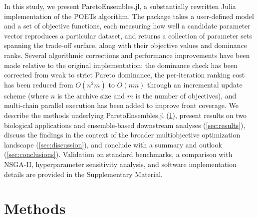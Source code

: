 \documentclass[preprint,review,12pt]{elsarticle}
\begin{document}
In this study, we present ParetoEnsembles.jl, a substantially rewritten Julia~\cite{Bezanson2017} implementation of the POETs algorithm.
The package takes a user-defined model and a set of objective functions, each measuring how well a candidate parameter vector reproduces a particular dataset, and returns a collection of parameter sets spanning the trade-off surface, along with their objective values and dominance ranks.
Several algorithmic corrections and performance improvements have been made relative to the original implementation: the dominance check has been corrected from weak to strict Pareto dominance, the per-iteration ranking cost has been reduced from $O(n^{2}m)$ to $O(nm)$ through an incremental update scheme (where $n$ is the archive size and $m$ is the number of objectives), and multi-chain parallel execution has been added to improve front coverage.
We describe the methods underlying ParetoEnsembles.jl (\cref{sec:methods}), present results on two biological applications and ensemble-based downstream analyses (\cref{sec:results}), discuss the findings in the context of the broader multiobjective optimization landscape (\cref{sec:discussion}), and conclude with a summary and outlook (\cref{sec:conclusions}).
Validation on standard benchmarks, a comparison with NSGA-II, hyperparameter sensitivity analysis, and software implementation details are provided in the Supplementary Material.

\section{Methods}\label{sec:methods}
\end{document}
